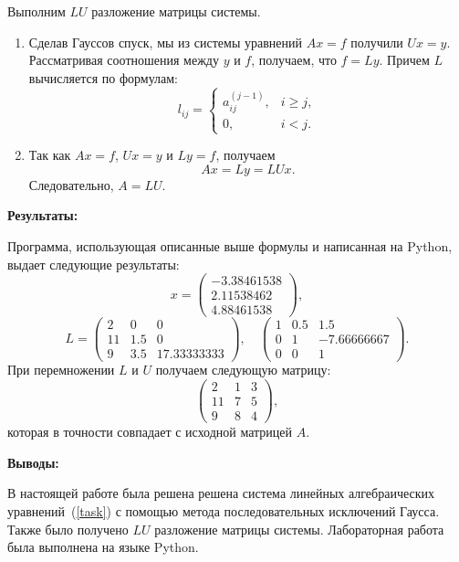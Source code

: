 Выполним $LU$ разложение матрицы системы.
\begin{enumerate}
    \item Сделав Гауссов спуск, мы из системы уравнений $Ax = f$ получили $Ux = y$. Рассматривая соотношения между $y$ и $f$, получаем, что $f = Ly$. Причем $L$ вычисляется по формулам:
    \begin{equation}
        l_{ij} = 
        \begin{cases}
            a_{ij}^{(j-1)}, & i \geq j, \\
            0, & i < j.
        \end{cases}
    \end{equation}
    \item Так как $Ax = f$, $Ux = y$ и $Ly = f$, получаем
    \begin{equation}
        Ax = Ly = LUx.
    \end{equation}
    Следовательно, $A = LU$.
\end{enumerate}

\textbf{Результаты:}

Программа, использующая описанные выше формулы и написанная на Python, выдает следующие результаты:
\begin{equation}
    x = \begin{pmatrix}
    -3.38461538 \\
    2.11538462 \\
    4.88461538
    \end{pmatrix},
\end{equation}
\begin{equation}
    L = \begin{pmatrix}
    2 & 0 & 0 \\
    11 & 1.5 & 0 \\
    9 & 3.5 & 17.33333333
    \end{pmatrix}, \quad
    \begin{pmatrix}
    1 & 0.5 & 1.5 \\
    0 & 1 & -7.66666667 \\
    0 & 0 & 1
    \end{pmatrix}.
\end{equation}
При перемножении $L$ и $U$ получаем следующую матрицу:
\begin{equation}
    \begin{pmatrix}
    2 & 1 & 3 \\
    11 & 7 & 5 \\
    9 & 8 & 4
\end{pmatrix},
\end{equation}
которая в точности совпадает с исходной матрицей $A$.

\textbf{Выводы:}

В настоящей работе была решена решена система линейных алгебраических уравнений~(\ref{task}) с помощью метода последовательных исключений Гаусса. Также было получено $LU$ разложение матрицы системы. Лабораторная работа была выполнена на языке Python.